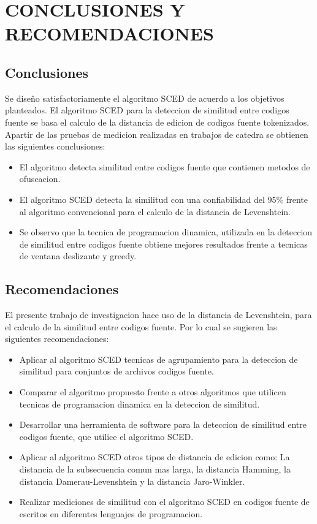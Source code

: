 \chapter{CONCLUSIONES Y RECOMENDACIONES}
\section{Conclusiones}
Se diseño satisfactoriamente el algoritmo SCED de acuerdo a los objetivos planteados. El algoritmo SCED para la deteccion de similitud entre codigos fuente se basa el calculo de la distancia de edicion de codigos fuente tokenizados. Apartir de las pruebas de medicion realizadas en trabajos de catedra se obtienen las siguientes conclusiones:

\begin{itemize}
  \item El algoritmo detecta similitud entre codigos fuente que contienen metodos de ofuscacion.
  \item El algoritmo SCED detecta la similitud con una confiabilidad del 95\% frente al algoritmo convencional para el calculo de la distancia de Levenshtein.
  \item Se observo que la tecnica de programacion dinamica, utilizada en la deteccion de similitud entre codigos fuente obtiene mejores resultados frente a tecnicas de ventana deslizante y greedy.
\end{itemize}

\section{Recomendaciones}
El presente trabajo de investigacion hace uso de la distancia de Levenshtein, para el calculo de la similitud entre codigos fuente. Por lo cual se sugieren las siguientes recomendaciones:
\begin{itemize}
  \item Aplicar al algoritmo SCED tecnicas de agrupamiento para la deteccion de similitud para conjuntos de archivos codigos fuente.
  \item Comparar el algoritmo propuesto frente a otros algoritmos que utilicen tecnicas de programacion dinamica en la deteccion de similitud.
  \item Desarrollar una herramienta de software para la deteccion de similitud entre codigos fuente, que utilice el algoritmo SCED.
  \item Aplicar al algoritmo SCED otros tipos de distancia de edicion como: La distancia de la subsecuencia comun mas larga, la distancia Hamming, la distancia Damerau-Levenshtein y la distancia Jaro-Winkler.
  \item Realizar mediciones de similitud con el algoritmo SCED en codigos fuente de escritos en diferentes lenguajes de programacion.
\end{itemize}
